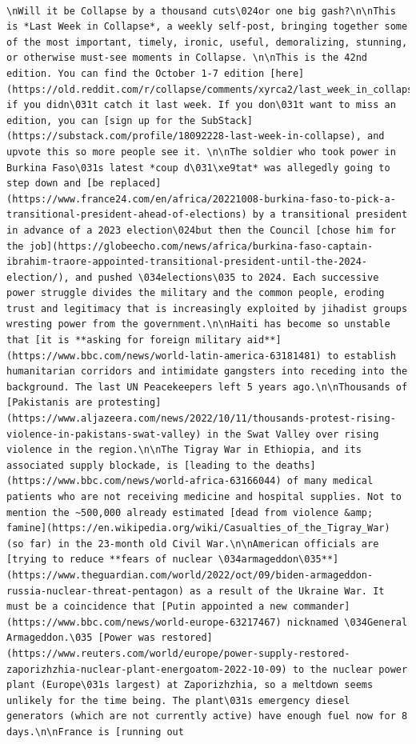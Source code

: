 \documentclass[
  letterpaper,
  DIV=11,
  numbers=noendperiod]{scrreprt}
\begin{document}
\begin{verbatim}
                                                                                                                                                                                                                                                                                                                                                                          \nWill it be Collapse by a thousand cuts\024or one big gash?\n\nThis is *Last Week in Collapse*, a weekly self-post, bringing together some of the most important, timely, ironic, useful, demoralizing, stunning, or otherwise must-see moments in Collapse. \n\nThis is the 42nd edition. You can find the October 1-7 edition [here](https://old.reddit.com/r/collapse/comments/xyrca2/last_week_in_collapse_october_17_2022/) if you didn\031t catch it last week. If you don\031t want to miss an edition, you can [sign up for the SubStack](https://substack.com/profile/18092228-last-week-in-collapse), and upvote this so more people see it. \n\nThe soldier who took power in Burkina Faso\031s latest *coup d\031\xe9tat* was allegedly going to step down and [be replaced](https://www.france24.com/en/africa/20221008-burkina-faso-to-pick-a-transitional-president-ahead-of-elections) by a transitional president in advance of a 2023 election\024but then the Council [chose him for the job](https://globeecho.com/news/africa/burkina-faso-captain-ibrahim-traore-appointed-transitional-president-until-the-2024-election/), and pushed \034elections\035 to 2024. Each successive power struggle divides the military and the common people, eroding trust and legitimacy that is increasingly exploited by jihadist groups wresting power from the government.\n\nHaiti has become so unstable that [it is **asking for foreign military aid**](https://www.bbc.com/news/world-latin-america-63181481) to establish humanitarian corridors and intimidate gangsters into receding into the background. The last UN Peacekeepers left 5 years ago.\n\nThousands of [Pakistanis are protesting](https://www.aljazeera.com/news/2022/10/11/thousands-protest-rising-violence-in-pakistans-swat-valley) in the Swat Valley over rising violence in the region.\n\nThe Tigray War in Ethiopia, and its associated supply blockade, is [leading to the deaths](https://www.bbc.com/news/world-africa-63166044) of many medical patients who are not receiving medicine and hospital supplies. Not to mention the ~500,000 already estimated [dead from violence &amp; famine](https://en.wikipedia.org/wiki/Casualties_of_the_Tigray_War) (so far) in the 23-month old Civil War.\n\nAmerican officials are [trying to reduce **fears of nuclear \034armageddon\035**](https://www.theguardian.com/world/2022/oct/09/biden-armageddon-russia-nuclear-threat-pentagon) as a result of the Ukraine War. It must be a coincidence that [Putin appointed a new commander](https://www.bbc.com/news/world-europe-63217467) nicknamed \034General Armageddon.\035 [Power was restored](https://www.reuters.com/world/europe/power-supply-restored-zaporizhzhia-nuclear-plant-energoatom-2022-10-09) to the nuclear power plant (Europe\031s largest) at Zaporizhzhia, so a meltdown seems unlikely for the time being. The plant\031s emergency diesel generators (which are not currently active) have enough fuel now for 8 days.\n\nFrance is [running out 
\end{verbatim}
\end{document}
